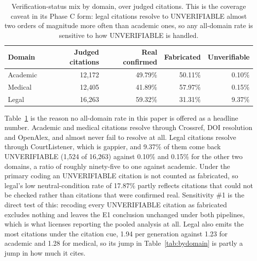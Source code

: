 \begin{table}[h]
\centering
\caption{Verification-status mix by domain, over judged citations. This is the
coverage caveat in its Phase C form: legal citations resolve to UNVERIFIABLE
almost two orders of magnitude more often than academic ones, so any all-domain
rate is sensitive to how UNVERIFIABLE is handled.}
\label{tab:coverage}
\small
\begin{tabular}{lrrrr}
\toprule
Domain & Judged citations & Real confirmed & Fabricated & Unverifiable \\
\midrule
Academic & 12{,}172 & 49.79\% & 50.11\% & 0.10\% \\
Medical  & 12{,}405 & 41.89\% & 57.97\% & 0.15\% \\
Legal    & 16{,}263 & 59.32\% & 31.31\% & 9.37\% \\
\bottomrule
\end{tabular}
\end{table}

Table~\ref{tab:coverage} is the reason no all-domain rate in this paper is
offered as a headline number. Academic and medical citations resolve through
Crossref, DOI resolution and OpenAlex, and almost never fail to resolve at all.
Legal citations resolve through CourtListener, which is gappier, and 9.37\% of
them come back UNVERIFIABLE (1,524 of 16,263) against 0.10\% and 0.15\% for the
other two domains, a ratio of roughly ninety-five to one against academic. Under the primary coding an UNVERIFIABLE citation is not counted as
fabricated, so legal's low neutral-condition rate of 17.87\% partly reflects
citations that could not be checked rather than citations that were confirmed
real. Sensitivity \#1 is the direct test of this: recoding every UNVERIFIABLE
citation as fabricated excludes nothing and leaves the E1 conclusion unchanged
under both pipelines, which is what licenses reporting the pooled analysis at
all. Legal also emits the most citations under the citation cue, 1.94 per
generation against 1.23 for academic and 1.28 for medical, so its jump in
Table~\ref{tab:bydomain} is partly a jump in how much it cites.
